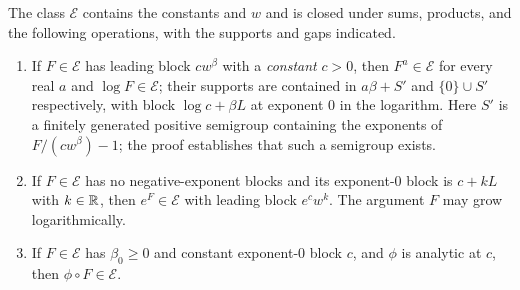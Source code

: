\begin{theorem}[Closure]
\label{thm:closure}
The class $\mathcal E$ contains the constants and $w$ and is closed under sums, products, and the following operations, with the supports and gaps indicated.
\begin{enumerate}[leftmargin=1.8em]
\item If $F\in\mathcal E$ has leading block $cw^\beta$ with a \emph{constant} $c>0$, then $F^a\in\mathcal E$ for every real $a$ and $\log F\in\mathcal E$; their supports are contained in $a\beta+S'$ and $\{0\}\cup S'$ respectively, with block $\log c+\beta L$ at exponent $0$ in the logarithm. Here $S'$ is a finitely generated positive semigroup containing the exponents of $F/(cw^\beta)-1$; the proof establishes that such a semigroup exists.
\item If $F\in\mathcal E$ has no negative-exponent blocks and its exponent-$0$ block is $c+kL$ with $k\in\mathbb R$, then $e^F\in\mathcal E$ with leading block $e^cw^k$. The argument $F$ may grow logarithmically.
\item If $F\in\mathcal E$ has $\beta_0\ge0$ and constant exponent-$0$ block $c$, and $\phi$ is analytic at $c$, then $\phi\circ F\in\mathcal E$.
\end{enumerate}
\end{theorem}
